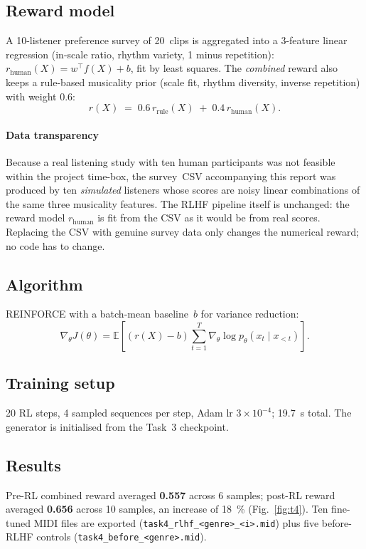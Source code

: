 \documentclass[conference]{IEEEtran}
\begin{document}
\subsection{Reward model}
A 10-listener preference survey of 20~clips is aggregated into a 3-feature
linear regression (in-scale ratio, rhythm variety, 1 minus repetition):
$r_{\mathrm{human}}(X) = w^\top f(X) + b$, fit by least squares.
The \emph{combined} reward also keeps a rule-based musicality prior
(scale fit, rhythm diversity, inverse repetition) with weight 0.6:
\begin{equation}
r(X) \;=\; 0.6\,r_{\mathrm{rule}}(X) \;+\; 0.4\,r_{\mathrm{human}}(X).
\end{equation}

\paragraph*{Data transparency} Because a real listening study with ten
human participants was not feasible within the project time-box, the
survey~CSV accompanying this report was produced by ten
\emph{simulated} listeners whose scores are noisy linear combinations of
the same three musicality features. The RLHF pipeline itself is unchanged:
the reward model $r_{\mathrm{human}}$ is fit from the CSV as it would be from
real scores. Replacing the CSV with genuine survey data only changes the
numerical reward; no code has to change.

\subsection{Algorithm}
REINFORCE with a batch-mean baseline~$b$ for variance reduction:
\begin{equation}
\nabla_\theta J(\theta) = \mathbb{E}\!\left[(r(X)-b)\sum_{t=1}^{T}\nabla_\theta\log p_\theta(x_t\mid x_{<t})\right].
\end{equation}

\subsection{Training setup}
20 RL steps, 4 sampled sequences per step, Adam lr $3\!\times\!10^{-4}$;
19.7~s total. The generator is initialised from the Task~3 checkpoint.

\subsection{Results}
Pre-RL combined reward averaged \textbf{0.557} across 6 samples; post-RL
reward averaged \textbf{0.656} across 10 samples, an increase of 18~\%
(Fig.~\ref{fig:t4}). Ten fine-tuned MIDI files are exported
(\texttt{task4\_rlhf\_<genre>\_<i>.mid}) plus five before-RLHF
controls (\texttt{task4\_before\_<genre>.mid}).
\end{document}
